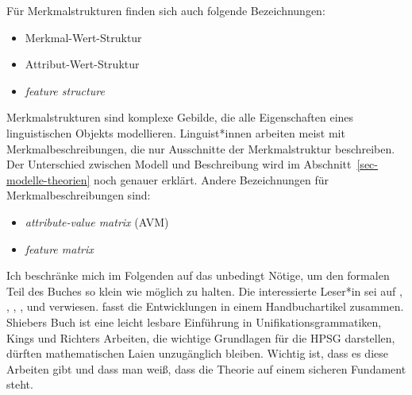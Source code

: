 




Für Merkmalstrukturen finden sich auch folgende Bezeichnungen: 
\begin{itemize}
\item Merkmal-Wert-Struktur
\item Attribut-Wert-Struktur
\item \emph{feature structure}
\end{itemize}
Merkmalstrukturen sind komplexe Gebilde, die alle Eigenschaften eines linguistischen
Objekts modellieren. Linguist*innen arbeiten meist mit Merkmalbeschreibungen, die nur Ausschnitte der
Merkmalstruktur beschreiben. Der Unterschied zwischen Modell und Beschreibung wird im Abschnitt~\ref{sec-modelle-theorien}
noch genauer erklärt. Andere Bezeichnungen für Merkmalbeschreibungen sind:
\begin{itemize}
\item \emph{attribute-value matrix} (AVM)
\item \emph{feature matrix}
\end{itemize}
Ich beschränke mich im Folgenden auf das unbedingt Nötige, um den formalen Teil
des Buches so klein wie möglich zu halten. Die interessierte Leser*in sei auf
\citet{Shieber86a}, \citet[Kapitel~2]{ps}, \citet{Johnson88}, \citet{Carpenter92a},
\citet{King94a} und \citet{Richter2004a-u} verwiesen. \citet{Richter2024a} fasst die Entwicklungen
in einem Handbuchartikel zusammen. Shiebers Buch ist
eine leicht lesbare Einführung in Unifikationsgrammatiken, Kings und Richters Arbeiten, die wichtige Grundlagen
für die HPSG darstellen, dürften mathematischen Laien unzugänglich bleiben.
Wichtig ist, dass es diese Arbeiten gibt und dass man weiß, dass die Theorie
auf einem sicheren Fundament steht.

